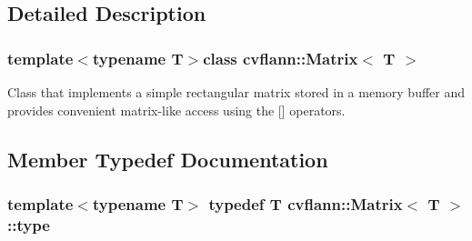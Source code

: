 \subsection{Detailed Description}
\subsubsection*{template$<$typename T$>$class cvflann\-::\-Matrix$<$ T $>$}

Class that implements a simple rectangular matrix stored in a memory buffer and provides convenient matrix-\/like access using the \mbox{[}\mbox{]} operators. 

\subsection{Member Typedef Documentation}
\hypertarget{classcvflann_1_1Matrix_af0a591e2717db3ee411a96aa52a93719}{
\subsubsection[{type}]{\setlength{\rightskip}{0pt plus 5cm}template$<$typename T$>$ typedef {\bf T} {\bf cvflann\-::\-Matrix}$<$ {\bf T} $>$\-::{\bf type}}}\label{classcvflann_1_1Matrix_af0a591e2717db3ee411a96aa52a93719}


